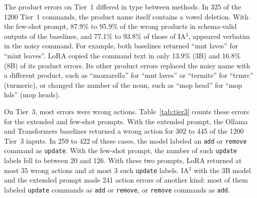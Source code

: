 \documentclass[journal,article,submit,pdftex,moreauthors]{Definitions/mdpi}
\begin{document}
The product errors on Tier~1 differed in type between methods. In 325 of the 1200 Tier~1 commands, the product name itself contains a vowel deletion. With the few-shot prompt, 87.9\% to 95.9\% of the wrong products in schema-valid outputs of the baselines, and 77.1\% to 93.8\% of those of IA$^3$, appeared verbatim in the noisy command. For example, both baselines returned ``mnt laves'' for ``mint leaves''. LoRA copied the command text in only 13.9\% (3B) and 16.8\% (8B) of its product errors. Its other product errors replaced the noisy name with a different product, such as ``mozzarella'' for ``mnt laves'' or ``termite'' for ``trmrc'' (turmeric), or changed the number of the noun, such as ``mop head'' for ``mop hds'' (mop heads).

On Tier~3, most errors were wrong actions. Table~\ref{tab:tier3} counts these errors for the extended and few-shot prompts. With the extended prompt, the Ollama and Transformers baselines returned a wrong action for 302 to 445 of the 1200 Tier~3 inputs. In 259 to 422 of these cases, the model labeled an \texttt{add} or \texttt{remove} command as \texttt{update}. With the few-shot prompt, the number of such \texttt{update} labels fell to between 20 and 126. With these two prompts, LoRA returned at most 35 wrong actions and at most 3 such \texttt{update} labels. IA$^3$ with the 3B model and the extended prompt made 241 action errors of another kind: most of them labeled \texttt{update} commands as \texttt{add} or \texttt{remove}, or \texttt{remove} commands as \texttt{add}.
\end{document}
